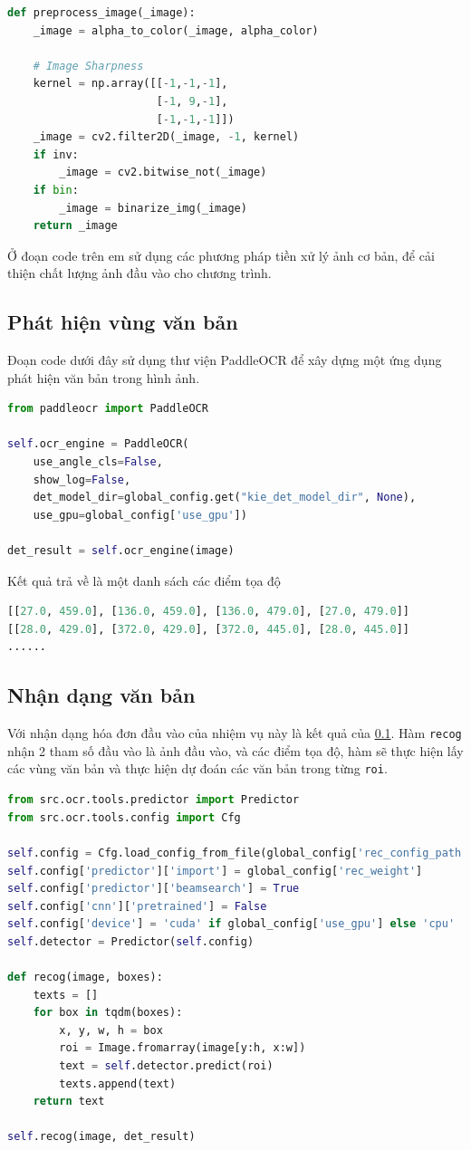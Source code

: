 \begin{lstlisting}[language=Python]
def preprocess_image(_image):
    _image = alpha_to_color(_image, alpha_color)

    # Image Sharpness
    kernel = np.array([[-1,-1,-1], 
                       [-1, 9,-1], 
                       [-1,-1,-1]])
    _image = cv2.filter2D(_image, -1, kernel)
    if inv:
        _image = cv2.bitwise_not(_image)
    if bin:
        _image = binarize_img(_image)
    return _image  
\end{lstlisting}

Ở đoạn code trên em sử dụng các phương pháp tiền xử lý ảnh cơ bản, để cải thiện chất lượng ảnh đầu vào cho chương trình.
\subsection{Phát hiện vùng văn bản} \label{detsec}
Đoạn code dưới đây sử dụng thư viện PaddleOCR để xây dựng một ứng dụng phát hiện văn bản trong hình ảnh.
\begin{lstlisting}[language=Python]
from paddleocr import PaddleOCR

self.ocr_engine = PaddleOCR(
    use_angle_cls=False,
    show_log=False,
    det_model_dir=global_config.get("kie_det_model_dir", None),
    use_gpu=global_config['use_gpu'])

det_result = self.ocr_engine(image)
\end{lstlisting}
Kết quả trả về là một danh sách các điểm tọa độ
\begin{lstlisting}[language=Python]
[[27.0, 459.0], [136.0, 459.0], [136.0, 479.0], [27.0, 479.0]]
[[28.0, 429.0], [372.0, 429.0], [372.0, 445.0], [28.0, 445.0]]
......
\end{lstlisting}

\subsection{Nhận dạng văn bản}
Với nhận dạng hóa đơn đầu vào của nhiệm vụ này là kết quả của \ref{detsec}. Hàm \texttt{recog} nhận 2 tham số đầu vào là ảnh đầu vào, và các điểm tọa độ, hàm sẽ thực hiện lấy các vùng văn bản và thực hiện dự đoán các văn bản trong từng \texttt{roi}.
\begin{lstlisting}[language=Python]
from src.ocr.tools.predictor import Predictor
from src.ocr.tools.config import Cfg

self.config = Cfg.load_config_from_file(global_config['rec_config_path'])
self.config['predictor']['import'] = global_config['rec_weight']
self.config['predictor']['beamsearch'] = True
self.config['cnn']['pretrained'] = False
self.config['device'] = 'cuda' if global_config['use_gpu'] else 'cpu'
self.detector = Predictor(self.config)

def recog(image, boxes):
    texts = []
    for box in tqdm(boxes):
        x, y, w, h = box
        roi = Image.fromarray(image[y:h, x:w])
        text = self.detector.predict(roi)
        texts.append(text)
    return text

self.recog(image, det_result)

\end{lstlisting}

